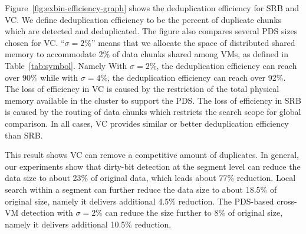 Figure~\ref{fig:exbin-efficiency-graph} shows the deduplication efficiency for SRB and VC.
We define deduplication efficiency to be the percent of duplicate chunks
which are detected and deduplicated.
The figure also compares several PDS sizes chosen for VC. ``$\sigma=2\%$'' means that
we allocate the space of distributed shared memory  to accommodate 2\%
of data chunks shared among VMs, as defined in Table~\ref{tab:symbol}. Namely 
With $\sigma=2\%$, the deduplication efficiency can reach over 90\% 
while with $\sigma=4\%$, the deduplication efficiency can reach over 92\%. 
The loss of efficiency in VC is caused by the restriction of the total physical memory available
in the cluster to support the PDS.  
The loss of efficiency in SRB is caused by the routing of data chunks which restricts the search scope
for global comparison.
In all cases, VC provides similar or better deduplication efficiency than SRB.

This result shows VC can remove  a competitive amount of duplicates.
In general, our experiments show that
dirty-bit detection at the segment level  can reduce the data size to about 23\% of original data, 
which leads  about 77\% reduction.
Local search within a segment can   further reduce the data size
to about 18.5\% of original size, namely it delivers additional 4.5\% reduction.
The PDS-based cross-VM detection with $\sigma=2\% $
can reduce the  size further to 8\% of original size, namely it 
delivers additional 10.5\% reduction.


